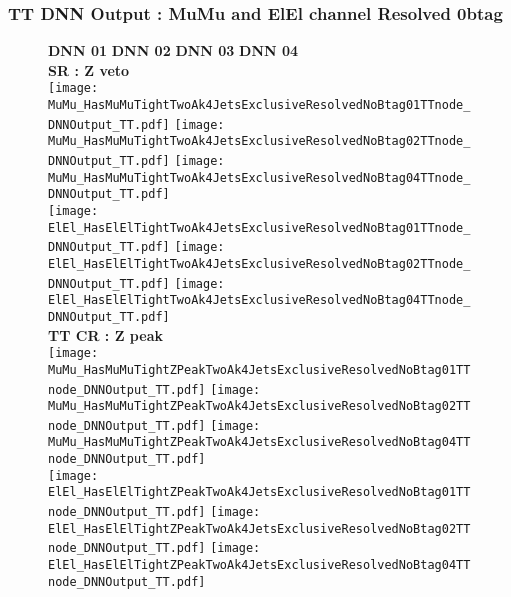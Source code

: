 \documentclass[9pt]{beamer}
\begin{document}
\begin{frame}
	\frametitle{TT DNN Output : MuMu and ElEl channel Resolved 0btag}
	\begin{figure}
	    \textbf{DNN 01} \hspace{1.2cm} \textbf{DNN 02} \hspace{1.2cm} \textbf{DNN 03} \hspace{1.2cm} \textbf{DNN 04} \\
        \centering
        \textbf{SR : Z veto} \\
		\texttt{[image: MuMu\_HasMuMuTightTwoAk4JetsExclusiveResolvedNoBtag01TTnode\_DNNOutput\_TT.pdf]}
		\texttt{[image: MuMu\_HasMuMuTightTwoAk4JetsExclusiveResolvedNoBtag02TTnode\_DNNOutput\_TT.pdf]}
        \hspace{2cm}
		\texttt{[image: MuMu\_HasMuMuTightTwoAk4JetsExclusiveResolvedNoBtag04TTnode\_DNNOutput\_TT.pdf]}\\
		\texttt{[image: ElEl\_HasElElTightTwoAk4JetsExclusiveResolvedNoBtag01TTnode\_DNNOutput\_TT.pdf]}
		\texttt{[image: ElEl\_HasElElTightTwoAk4JetsExclusiveResolvedNoBtag02TTnode\_DNNOutput\_TT.pdf]}
        \hspace{2cm}
		\texttt{[image: ElEl\_HasElElTightTwoAk4JetsExclusiveResolvedNoBtag04TTnode\_DNNOutput\_TT.pdf]}\\
        \textbf{TT CR : Z peak} \\
		\texttt{[image: MuMu\_HasMuMuTightZPeakTwoAk4JetsExclusiveResolvedNoBtag01TTnode\_DNNOutput\_TT.pdf]}
		\texttt{[image: MuMu\_HasMuMuTightZPeakTwoAk4JetsExclusiveResolvedNoBtag02TTnode\_DNNOutput\_TT.pdf]}
        \hspace{2cm}
		\texttt{[image: MuMu\_HasMuMuTightZPeakTwoAk4JetsExclusiveResolvedNoBtag04TTnode\_DNNOutput\_TT.pdf]}\\
		\texttt{[image: ElEl\_HasElElTightZPeakTwoAk4JetsExclusiveResolvedNoBtag01TTnode\_DNNOutput\_TT.pdf]}
		\texttt{[image: ElEl\_HasElElTightZPeakTwoAk4JetsExclusiveResolvedNoBtag02TTnode\_DNNOutput\_TT.pdf]}
        \hspace{2cm}
		\texttt{[image: ElEl\_HasElElTightZPeakTwoAk4JetsExclusiveResolvedNoBtag04TTnode\_DNNOutput\_TT.pdf]}\\
	\end{figure}
\end{frame}
\end{document}
